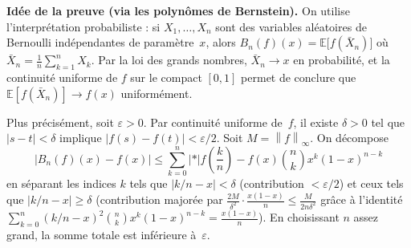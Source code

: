 \documentclass[12pt,a4paper,openany]{book}
\theoremstyle{definition}
\newcommand{\eps}{\varepsilon}
\newcommand{\abs}[1]{\left\lvert #1 \right\rvert}
\newcommand{\norm}[1]{\left\lVert #1 \right\rVert}
\begin{document}
\noindent\textbf{Idée de la preuve (via les polynômes de Bernstein).}
On utilise l'interprétation probabiliste : si $X_1, \ldots, X_n$ sont des variables aléatoires de Bernoulli indépendantes de paramètre~$x$, alors $B_n(f)(x) = \mathbb{E}\bigl[f(\bar{X}_n)\bigr]$ où $\bar{X}_n = \frac{1}{n}\sum_{k=1}^n X_k$. Par la loi des grands nombres, $\bar{X}_n \to x$ en probabilité, et la continuité uniforme de $f$ sur le compact $[0,1]$ permet de conclure que $\mathbb{E}[f(\bar{X}_n)] \to f(x)$ uniformément.

Plus précisément, soit $\eps > 0$. Par continuité uniforme de~$f$, il existe $\delta > 0$ tel que $\abs{s - t} < \delta$ implique $\abs{f(s) - f(t)} < \eps/2$. Soit $M = \norm{f}_\infty$. On décompose
\[
  \abs{B_n(f)(x) - f(x)} \leqslant \sum_{k=0}^{n}\abs*{f\!\left(\frac{k}{n}\right) - f(x)}\binom{n}{k}x^k(1-x)^{n-k}
\]
en séparant les indices $k$ tels que $\abs{k/n - x} < \delta$ (contribution $< \eps/2$) et ceux tels que $\abs{k/n - x} \geqslant \delta$ (contribution majorée par $\frac{2M}{\delta^2}\cdot\frac{x(1-x)}{n} \leqslant \frac{M}{2n\delta^2}$ grâce à l'identité $\sum_{k=0}^n (k/n - x)^2\binom{n}{k}x^k(1-x)^{n-k} = \frac{x(1-x)}{n}$). En choisissant $n$ assez grand, la somme totale est inférieure à~$\eps$.

\begin{center}
\end{center}
\end{document}
